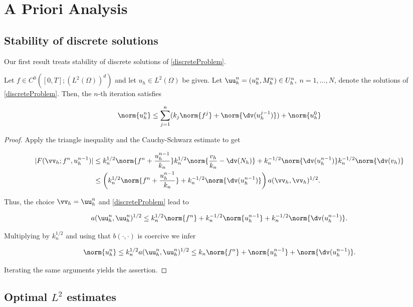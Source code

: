 \section{A Priori Analysis}

\subsection{Stability of discrete solutions}

Our first result treats stability of discrete solutions of \eqref{discreteProblem}.

\begin{teor}
    Let $f\in C^0([0,T];(L^2(\Omega))^d)$ and let $u_h\in L^2(\Omega)$ be given. Let $\uu_h^n=(u_h^n,M_h^n)\in U_h^n,$ $n=1,\dots,N$, denote the solutions of \eqref{discreteProblem}. Then, the $n$-th iteration satisfies 

    $$\norm{u_h^n}\leq \displaystyle\sum_{j=1}^n(k_j\norm{f^j}+\norm{\dv(u_h^{j-1})})+\norm{u_h^0}$$
\end{teor}

\begin{proof}
    Apply the triangle inequality and the Cauchy-Schwarz estimate to get

    \begin{align*}
        |F(\vv_h;f^n,u_h^{n-1})|&\leq k_n^{1/2}\norm{f^n+\frac{u_h^{n-1}}{k_n}}k_n^{1/2}\norm{\frac{v_h}{k_n}-\dv(N_h)}+k_n^{-1/2}\norm{\dv(u_h^{n-1})}k_n^{-1/2}\norm{\dv(v_h)}\\
        &\leq\left(k_n^{1/2}\norm{f^n+\frac{u_h^{n-1}}{k_n}}+k_n^{-1/2}\norm{\dv(u_h^{n-1})}\right)a(\vv_h,\vv_h)^{1/2}.
    \end{align*}

    Thus, the choice $\vv_h=\uu_h^n$ and \eqref{discreteProblem} lead to

    $$a(\uu_h^n,\uu_h^n)^{1/2}\leq k_n^{1/2}\norm{f^n}+k_n^{-1/2}\norm{u_h^{n-1}}+k_n^{-1/2}\norm{\dv(u_h^{n-1})}.$$

    Multiplying by $k_n^{1/2}$ and using that $b(\cdot,\cdot)$ is coercive we infer

    $$\norm{u_h^n}\leq k_n^{1/2}a(\uu_h^n,\uu_h^n)^{1/2}\leq k_n\norm{f^n}+\norm{u_h^{n-1}}+\norm{\dv(u_h^{n-1})}.$$

    Iterating the same arguments yields the assertion.
\end{proof}

\subsection{Optimal $L^2$ estimates}

